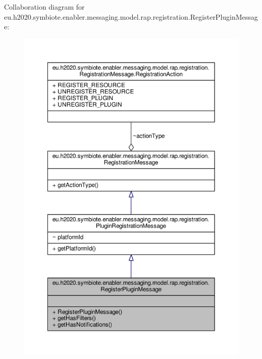 Collaboration diagram for eu.\+h2020.\+symbiote.\+enabler.\+messaging.\+model.\+rap.\+registration.\+Register\+Plugin\+Message\+:
\nopagebreak
\begin{figure}[H]
\begin{center}
\leavevmode
\includegraphics[width=350pt]{classeu_1_1h2020_1_1symbiote_1_1enabler_1_1messaging_1_1model_1_1rap_1_1registration_1_1RegisterPluginMessage__coll__graph}
\end{center}
\end{figure}
